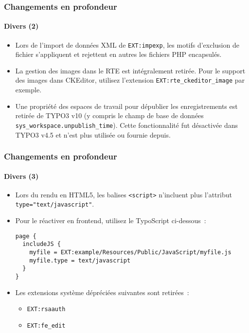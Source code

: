 \begin{frame}[fragile]
	\frametitle{Changements en profondeur}
	\framesubtitle{Divers (2)}

	\lstset{basicstyle=\tiny\ttfamily}

	\begin{itemize}

		\item Lors de l'import de données XML de \texttt{EXT:impexp}, les motifs d'exclusion de
			fichier s'appliquent et rejettent en autres les fichiers PHP encapsulés.

		\item La gestion des images dans le RTE est intégralement retirée.
			Pour le support des images dans CKEditor, utilisez l'extension \texttt{EXT:rte\_ckeditor\_image} par exemple.

		\item Une propriété des espaces de travail pour dépublier les enregistrements est retirée de TYPO3 v10
			(y compris le champ de base de données \texttt{sys\_workspace.unpublish\_time}).
			Cette fonctionnalité fut désactivée dans TYPO3 v4.5 et n'est plus utilisée ou fournie depuis.

	\end{itemize}

\end{frame}


\begin{frame}[fragile]
	\frametitle{Changements en profondeur}
	\framesubtitle{Divers (3)}

	\lstset{basicstyle=\tiny\ttfamily}

	\begin{itemize}

		\item Lors du rendu en HTML5, les balises \texttt{<script>} n'incluent plus l'attribut \texttt{type="text/javascript"}.
		\item Pour le réactiver en frontend, utilisez le TypoScript ci-dessous~:

\begin{lstlisting}
page {
  includeJS {
    myfile = EXT:example/Resources/Public/JavaScript/myfile.js
    myfile.type = text/javascript
  }
}
\end{lstlisting}

		\item Les extensions système dépréciées suivantes sont retirées~:
			\begin{itemize}
				\item \texttt{EXT:rsaauth}
				\item \texttt{EXT:fe\_edit}
			\end{itemize}

	\end{itemize}

\end{frame}


